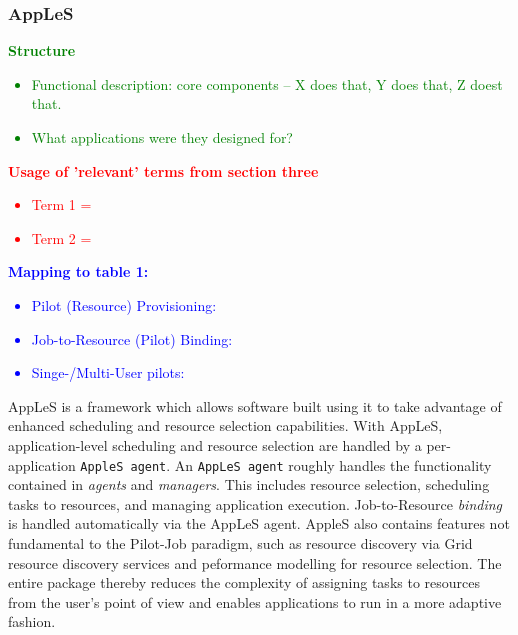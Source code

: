 \documentclass{sig-alternate}
\begin{document}
%
\subsubsection{AppLeS}

\textcolor{green}
{
\textbf{Structure}
\begin{itemize}
\item Functional description: core components -- X does that, Y does that, Z doest that.
\item What applications were they designed for?
\end{itemize}
}

\textcolor{red}
{
\textbf{Usage of 'relevant' terms from section three}
\begin{itemize}
\item Term 1 =
\item Term 2 =
\end{itemize}
}

\textcolor{blue}
{
\textbf{Mapping to table 1:}
\begin{itemize}
\item Pilot (Resource) Provisioning:
\item Job-to-Resource (Pilot) Binding:
\item Singe-/Multi-User pilots:
\end{itemize}
}

AppLeS is a framework which allows software built using it to take advantage
of enhanced scheduling and resource selection capabilities.
With AppLeS, application-level scheduling and resource selection are handled by a
per-application \texttt{AppleS agent}.
An \texttt{AppLeS agent} roughly handles the \pilotjob functionality contained in
\textit{\pilotjob agents} and \textit{managers}.  This includes resource
selection, scheduling tasks to resources, and managing application execution.
Job-to-Resource \textit{binding} is handled automatically via the AppLeS agent.
AppleS also contains features not fundamental to the Pilot-Job paradigm, such
as resource discovery via Grid resource discovery services and peformance
modelling for resource selection.  The entire package thereby reduces the
complexity of assigning tasks to resources from the user's point of view
and enables applications to run in a more adaptive fashion.
\end{document}
